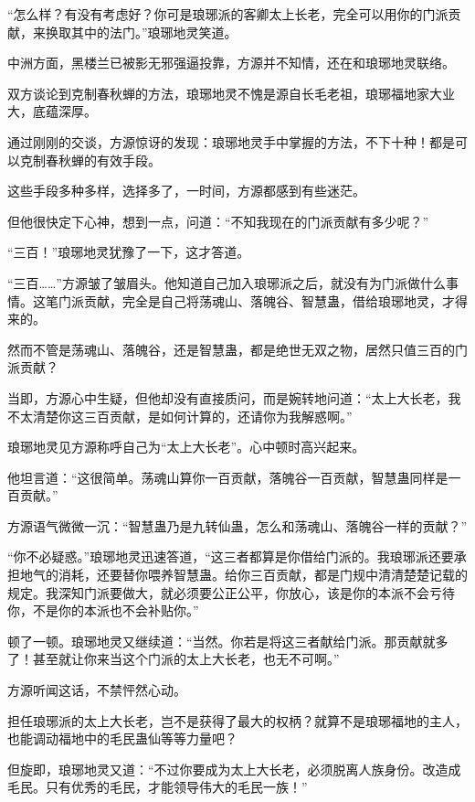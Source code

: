 
\begin{this_body}

“怎么样？有没有考虑好？你可是琅琊派的客卿太上长老，完全可以用你的门派贡献，来换取其中的法门。”琅琊地灵笑道。

中洲方面，黑楼兰已被影无邪强逼投靠，方源并不知情，还在和琅琊地灵联络。

双方谈论到克制春秋蝉的方法，琅琊地灵不愧是源自长毛老祖，琅琊福地家大业大，底蕴深厚。

通过刚刚的交谈，方源惊讶的发现：琅琊地灵手中掌握的方法，不下十种！都是可以克制春秋蝉的有效手段。

这些手段多种多样，选择多了，一时间，方源都感到有些迷茫。

但他很快定下心神，想到一点，问道：“不知我现在的门派贡献有多少呢？”

“三百！”琅琊地灵犹豫了一下，这才答道。

“三百……”方源皱了皱眉头。他知道自己加入琅琊派之后，就没有为门派做什么事情。这笔门派贡献，完全是自己将荡魂山、落魄谷、智慧蛊，借给琅琊地灵，才得来的。

然而不管是荡魂山、落魄谷，还是智慧蛊，都是绝世无双之物，居然只值三百的门派贡献？

当即，方源心中生疑，但他却没有直接质问，而是婉转地问道：“太上大长老，我不太清楚你这三百贡献，是如何计算的，还请你为我解惑啊。”

琅琊地灵见方源称呼自己为“太上大长老”。心中顿时高兴起来。

他坦言道：“这很简单。荡魂山算你一百贡献，落魄谷一百贡献，智慧蛊同样是一百贡献。”

方源语气微微一沉：“智慧蛊乃是九转仙蛊，怎么和荡魂山、落魄谷一样的贡献？”

“你不必疑惑。”琅琊地灵迅速答道，“这三者都算是你借给门派的。我琅琊派还要承担地气的消耗，还要替你喂养智慧蛊。给你三百贡献，都是门规中清清楚楚记载的规定。我深知门派要做大，就必须要公正公平，你放心，该是你的本派不会亏待你，不是你的本派也不会补贴你。”

顿了一顿。琅琊地灵又继续道：“当然。你若是将这三者献给门派。那贡献就多了！甚至就让你来当这个门派的太上大长老，也无不可啊。”

方源听闻这话，不禁怦然心动。

担任琅琊派的太上大长老，岂不是获得了最大的权柄？就算不是琅琊福地的主人，也能调动福地中的毛民蛊仙等等力量吧？

但旋即，琅琊地灵又道：“不过你要成为太上大长老，必须脱离人族身份。改造成毛民。只有优秀的毛民，才能领导伟大的毛民一族！”


\end{this_body}
